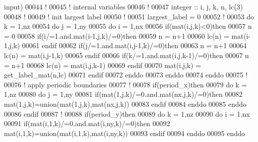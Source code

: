 \begin{DoxyCode}
{       input)}
00044     \textcolor{comment}{!}
00045     \textcolor{comment}{! internal variables}
00046     \textcolor{comment}{! }
00047     \textcolor{keywordtype}{integer} :: i, j, k, n, lc(3)
00048     \textcolor{comment}{!}
00049     \textcolor{comment}{! init largest label}
00050     \textcolor{comment}{!}
00051     largest\_label = 0
00052     \textcolor{comment}{!}
00053     \textcolor{keyword}{do} k = 1,nz
00054        \textcolor{keyword}{do} j = 1,ny
00055           \textcolor{keyword}{do} i = 1,nx
00056              \textcolor{keyword}{if}(mat(i,j,k)<0)\textcolor{keyword}{then}
00057                 n = 0
00058                 \textcolor{keyword}{if}(i/=1.and.mat(i-1,j,k)/=0)\textcolor{keyword}{then}
00059                    n = n+1
00060                    lc(n) = mat(i-1,j,k)
00061                 \textcolor{keyword}{endif}
00062                 \textcolor{keyword}{if}(j/=1.and.mat(i,j-1,k)/=0)\textcolor{keyword}{then}
00063                    n = n+1
00064                    lc(n) = mat(i,j-1,k)
00065                 \textcolor{keyword}{endif}
00066                 \textcolor{keyword}{if}(k/=1.and.mat(i,j,k-1)/=0)\textcolor{keyword}{then}
00067                    n = n+1
00068                    lc(n) = mat(i,j,k-1)
00069                 \textcolor{keyword}{endif}
00070                 mat(i,j,k) = get\_label\_mat(n,lc)
00071              \textcolor{keyword}{endif}
00072           \textcolor{keyword}{enddo}
00073        \textcolor{keyword}{enddo}
00074     \textcolor{keyword}{enddo}
00075     \textcolor{comment}{!}
00076     \textcolor{comment}{! apply periodic boundaries}
00077     \textcolor{comment}{!}
00078     \textcolor{keyword}{if}(period\_x)\textcolor{keyword}{then}
00079        \textcolor{keyword}{do} k = 1,nz
00080           \textcolor{keyword}{do} j = 1,ny
00081              \textcolor{keyword}{if}(mat(1,j,k)/=0.and.mat(nx,j,k)/=0)\textcolor{keyword}{then}
00082                 mat(1,j,k)=union(mat(1,j,k),mat(nx,j,k))
00083              \textcolor{keyword}{endif}
00084           \textcolor{keyword}{enddo}
00085        \textcolor{keyword}{enddo}
00086     \textcolor{keyword}{endif}
00087     \textcolor{comment}{!}
00088     \textcolor{keyword}{if}(period\_y)\textcolor{keyword}{then}
00089        \textcolor{keyword}{do} k = 1,nz
00090           \textcolor{keyword}{do} i = 1,nx
00091              \textcolor{keyword}{if}(mat(i,1,k)/=0.and.mat(i,ny,k)/=0)\textcolor{keyword}{then}
00092                 mat(i,1,k)=union(mat(i,1,k),mat(i,ny,k))
00093              \textcolor{keyword}{endif}
00094           \textcolor{keyword}{enddo}
00095        \textcolor{keyword}{enddo}

\end{DoxyCode}
